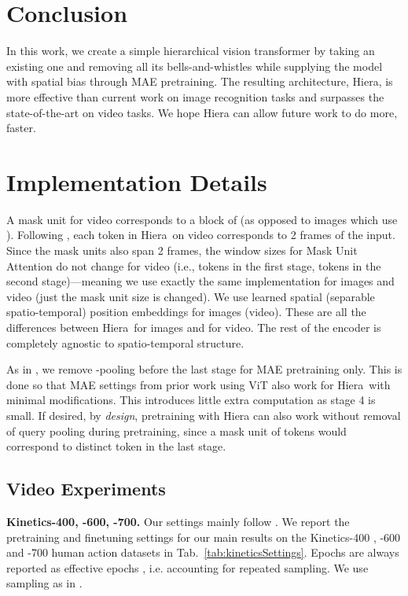 \documentclass[nohyperref]{article}
\renewcommand{\paragraph}[1]{\vspace{1.25mm}\noindent\textbf{#1}}
\newcommand{\shortname}{{Hiera}}
\theoremstyle{plain}
\theoremstyle{definition}
\theoremstyle{remark}
\begin{document}
\section{Conclusion}
In this work, we create a simple hierarchical vision transformer by taking an existing one and removing all its bells-and-whistles while supplying the model with spatial bias through MAE pretraining. The resulting architecture, \shortname{}, is more effective than current work on image recognition tasks and surpasses the state-of-the-art on video tasks. We hope \shortname{} can allow future work to do more, faster.

\appendix





\section{Implementation Details}
A mask unit for video corresponds to a block of  (as opposed to images which use ). Following \citet{mae-st}, each token in \shortname{}~on video corresponds to 2 frames of the input. Since the mask units also span 2 frames, the window sizes for Mask Unit Attention do not change for video (i.e.,  tokens in the first stage,  tokens in the second stage)---meaning we use exactly the same implementation for images and video (just the mask unit size is changed). We use learned spatial (separable spatio-temporal) position embeddings for images (video). These are all the differences between \shortname{}~for images and for video. The rest of the encoder is completely agnostic to spatio-temporal structure.

As in \citet{maskfeat}, we remove -pooling before the last stage for MAE pretraining only. This is done so that MAE settings from prior work using ViT also work for \shortname{}~with minimal modifications. This introduces little extra computation as stage 4 is small. If desired, by \textit{design}, pretraining with \shortname{} can also work without removal of query pooling during pretraining, since a mask unit of  tokens would correspond to  distinct token in the last stage.


\subsection{Video Experiments}

\paragraph{Kinetics-400, -600, -700.} Our settings mainly follow \citet{mae-st}. We report the pretraining and finetuning settings for our main results on the Kinetics-400 \cite{k400}, -600 \cite{k600} and -700 \cite{k700} human action datasets in Tab.~\ref{tab:kineticsSettings}. Epochs are always reported as effective epochs \cite{mae-st}, i.e. accounting for repeated sampling. We use  sampling as in \citet{mae-st}.
\end{document}
